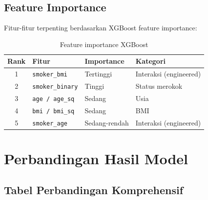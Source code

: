 \documentclass[12pt,a4paper]{article}
\begin{document}
\subsection{Feature Importance}
Fitur-fitur terpenting berdasarkan XGBoost feature importance:

\begin{table}[h!]
\centering
\caption{Feature importance XGBoost}
\begin{tabular}{clll}
\toprule
\textbf{Rank} & \textbf{Fitur} & \textbf{Importance} & \textbf{Kategori} \\
\midrule
1 & \texttt{smoker\_bmi}   & Tertinggi      & Interaksi (engineered) \\
2 & \texttt{smoker\_binary} & Tinggi        & Status merokok \\
3 & \texttt{age / age\_sq} & Sedang         & Usia \\
4 & \texttt{bmi / bmi\_sq} & Sedang         & BMI \\
5 & \texttt{smoker\_age}   & Sedang-rendah  & Interaksi (engineered) \\
\bottomrule
\end{tabular}
\end{table}


\section{Perbandingan Hasil Model}

\subsection{Tabel Perbandingan Komprehensif}
\end{document}
